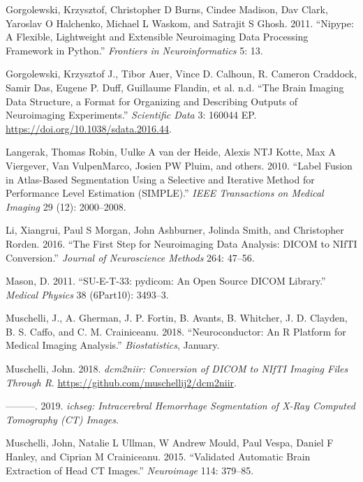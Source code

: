 \documentclass[]{elsarticle} %
\begin{document}
\leavevmode\hypertarget{ref-nipype}{}%
Gorgolewski, Krzysztof, Christopher D Burns, Cindee Madison, Dav Clark, Yaroslav O Halchenko, Michael L Waskom, and Satrajit S Ghosh. 2011. ``Nipype: A Flexible, Lightweight and Extensible Neuroimaging Data Processing Framework in Python.'' \emph{Frontiers in Neuroinformatics} 5: 13.

\leavevmode\hypertarget{ref-bids}{}%
Gorgolewski, Krzysztof J., Tibor Auer, Vince D. Calhoun, R. Cameron Craddock, Samir Das, Eugene P. Duff, Guillaume Flandin, et al. n.d. ``The Brain Imaging Data Structure, a Format for Organizing and Describing Outputs of Neuroimaging Experiments.'' \emph{Scientific Data} 3: 160044 EP. \url{https://doi.org/10.1038/sdata.2016.44}.

\leavevmode\hypertarget{ref-langerak2010label}{}%
Langerak, Thomas Robin, Uulke A van der Heide, Alexis NTJ Kotte, Max A Viergever, Van VulpenMarco, Josien PW Pluim, and others. 2010. ``Label Fusion in Atlas-Based Segmentation Using a Selective and Iterative Method for Performance Level Estimation (SIMPLE).'' \emph{IEEE Transactions on Medical Imaging} 29 (12): 2000--2008.

\leavevmode\hypertarget{ref-dcm2niix}{}%
Li, Xiangrui, Paul S Morgan, John Ashburner, Jolinda Smith, and Christopher Rorden. 2016. ``The First Step for Neuroimaging Data Analysis: DICOM to NIfTI Conversion.'' \emph{Journal of Neuroscience Methods} 264: 47--56.

\leavevmode\hypertarget{ref-pydicom}{}%
Mason, D. 2011. ``SU-E-T-33: pydicom: An Open Source DICOM Library.'' \emph{Medical Physics} 38 (6Part10): 3493--3.

\leavevmode\hypertarget{ref-neuroconductor}{}%
Muschelli, J., A. Gherman, J. P. Fortin, B. Avants, B. Whitcher, J. D. Clayden, B. S. Caffo, and C. M. Crainiceanu. 2018. ``Neuroconductor: An R Platform for Medical Imaging Analysis.'' \emph{Biostatistics}, January.

\leavevmode\hypertarget{ref-dcm2niir}{}%
Muschelli, John. 2018. \emph{dcm2niir: Conversion of DICOM to NIfTI Imaging Files Through R}. \url{https://github.com/muschellij2/dcm2niir}.

\leavevmode\hypertarget{ref-ichseg}{}%
---------. 2019. \emph{ichseg: Intracerebral Hemorrhage Segmentation of X-Ray Computed Tomography (CT) Images}.

\leavevmode\hypertarget{ref-ctbet}{}%
Muschelli, John, Natalie L Ullman, W Andrew Mould, Paul Vespa, Daniel F Hanley, and Ciprian M Crainiceanu. 2015. ``Validated Automatic Brain Extraction of Head CT Images.'' \emph{Neuroimage} 114: 379--85.
\end{document}
